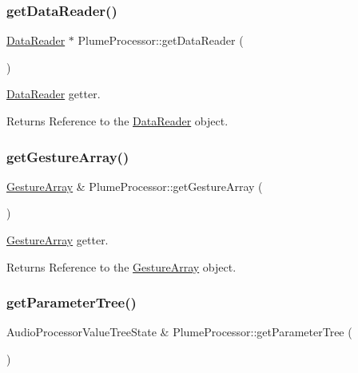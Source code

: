 \subsubsection{\texorpdfstring{get\+Data\+Reader()}{getDataReader()}}
{\footnotesize\ttfamily \mbox{\hyperlink{class_data_reader}{Data\+Reader}} $\ast$ Plume\+Processor\+::get\+Data\+Reader (\begin{DoxyParamCaption}{ }\end{DoxyParamCaption})}



\mbox{\hyperlink{class_data_reader}{Data\+Reader}} getter. 

\begin{DoxyReturn}{Returns}
Reference to the \mbox{\hyperlink{class_data_reader}{Data\+Reader}} object. 
\end{DoxyReturn}
\mbox{\label{class_plume_processor_a691a2f342167e257fabf74d0bb76a563}} 
\subsubsection{\texorpdfstring{get\+Gesture\+Array()}{getGestureArray()}}
{\footnotesize\ttfamily \mbox{\hyperlink{class_gesture_array}{Gesture\+Array}} \& Plume\+Processor\+::get\+Gesture\+Array (\begin{DoxyParamCaption}{ }\end{DoxyParamCaption})}



\mbox{\hyperlink{class_gesture_array}{Gesture\+Array}} getter. 

\begin{DoxyReturn}{Returns}
Reference to the \mbox{\hyperlink{class_gesture_array}{Gesture\+Array}} object. 
\end{DoxyReturn}
\mbox{\label{class_plume_processor_a644209f6f5ffcd173b09cc897932bba2}} 
\subsubsection{\texorpdfstring{get\+Parameter\+Tree()}{getParameterTree()}}
{\footnotesize\ttfamily Audio\+Processor\+Value\+Tree\+State \& Plume\+Processor\+::get\+Parameter\+Tree (\begin{DoxyParamCaption}{ }\end{DoxyParamCaption})}



